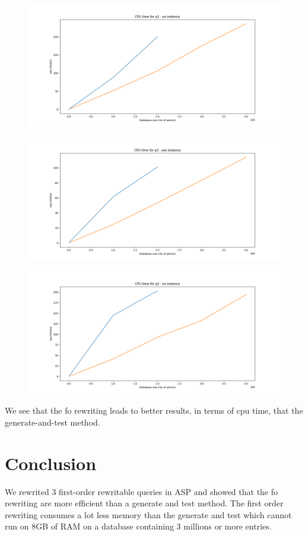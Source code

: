 \begin{figure}[H]
\includegraphics[width=\textwidth]{time_q2_noinstance.png}
\centering
\end{figure}

\begin{figure}[H]
\includegraphics[width=\textwidth]{time_q3_yesinstance.png}
\centering
\end{figure}

\begin{figure}[H]
\includegraphics[width=\textwidth]{time_q3_noinstance.png}
\centering
\end{figure}

We see that the fo rewriting leads to better results, in terms of cpu time, that the generate-and-test method.

\section{Conclusion}

We rewrited 3 first-order rewritable queries in ASP and showed that the fo rewriting are more efficient than a generate and test method. The first order rewriting consumes a lot less memory than the generate and test which cannot run on 8GB of RAM on a database containing 3 millions or more entries.
